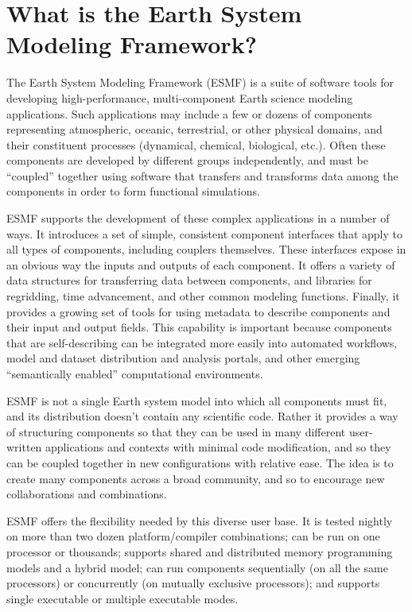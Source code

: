 
\section{What is the Earth System Modeling Framework?}

The Earth System Modeling Framework (ESMF) is a suite of software
tools for developing high-performance, multi-component Earth science
modeling applications.  Such applications may include a few or dozens
of components representing atmospheric, oceanic, terrestrial, or
other physical domains, and their constituent processes (dynamical, chemical,
biological, etc.).  Often these components are developed by different
groups independently, and must be ``coupled'' together using software
that transfers and transforms data among the components in order to form
functional simulations.

ESMF supports the development of these complex applications in a number
of ways.  It introduces a set of simple, consistent component interfaces
that apply to all types of components, including couplers themselves.  These
interfaces expose in an obvious way the inputs and outputs of each component.
It offers a variety of data structures for transferring data between components, 
and libraries for regridding, time advancement, and other common modeling
functions.  Finally, it provides a growing set of tools for using metadata
to describe components and their input and output fields.  This capability
is important because components that are self-describing
can be integrated more easily into automated workflows, model and dataset
distribution and analysis portals, and other emerging ``semantically enabled''
computational environments.

ESMF is not a single Earth system model into which all components
must fit, and its distribution doesn't contain any scientific code.
Rather it provides a way of structuring components so that they can be used 
in many different user-written applications and contexts with minimal code
modification, and so they can be coupled together in new configurations
with relative ease.  The idea is to create many components across a
broad community, and so to encourage new collaborations and combinations.

ESMF offers the flexibility needed by this diverse user base.  It is tested
nightly on more than two dozen platform/compiler combinations; can be
run on one processor or thousands; supports shared and distributed memory
programming models and a hybrid model; can run components
sequentially (on all the same processors) or concurrently (on mutually
exclusive processors); and supports single executable or multiple
executable modes.

